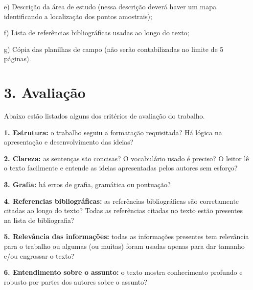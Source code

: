 \documentclass[a4paper,10pt]{article}
\begin{document}
    e) Descrição da área de estudo (nessa descrição deverá haver um mapa identificando a localização dos pontos amostrais);

    f) Lista de referências bibliográficas usadas ao longo do texto;

    g) Cópia das planilhas de campo (não serão contabilizadas no limite de 5 páginas).

  \section* {3. Avaliação}

    Abaixo estão listados alguns dos critérios de avaliação do trabalho.

    \textbf{1. Estrutura:} o trabalho seguiu a formatação requisitada? Há lógica na apresentação e desenvolvimento das ideias?

    \textbf{2. Clareza:} as sentenças são concisas? O vocabulário usado é preciso? O leitor lê o texto facilmente e entende as ideias apresentadas pelos autores sem esforço?

    \textbf{3. Grafia:} há erros de grafia, gramática ou pontuação?

    \textbf{4. Referencias bibliográficas:} as referências bibliográficas são corretamente citadas ao longo do texto? Todas as referências citadas no texto estão presentes na lista de bibliografia?

    \textbf{5. Relevância das informações:} todas as informações presentes tem relevância para o trabalho ou algumas (ou muitas) foram usadas apenas para dar tamanho e/ou engrossar o texto?

    \textbf{6. Entendimento sobre o assunto:} o texto mostra conhecimento profundo e robusto por partes dos autores sobre o assunto?

  \clearpage %
\end{document}
